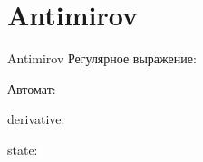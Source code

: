 \section{Antimirov}
\begin{frame}{Antimirov}
	Регулярное выражение:

	Автомат:


	derivative:


	state:


\end{frame}


